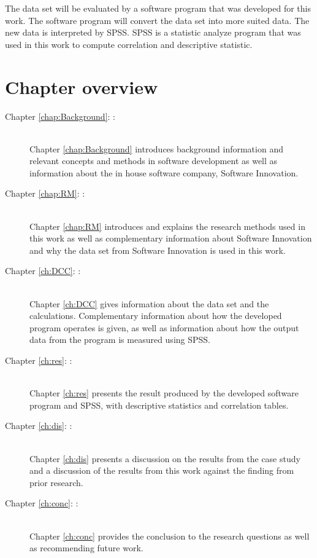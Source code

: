 \documentclass[UKenglish]{ifimaster}  %
\begin{document}
The data set will be evaluated by a software program that was developed for this work. The software program will convert the data set into more suited data. The new data is interpreted by SPSS. SPSS is a statistic analyze program that was used in this work to compute correlation and descriptive statistic. 

\section{Chapter overview}
\begin{description}
\item[Chapter \ref{chap:Background}: :] \hfill \\  
Chapter \ref{chap:Background} introduces background information and relevant concepts and methods in software development as well as information about the in house software company, Software Innovation. 
\item[Chapter \ref{chap:RM}: :] \hfill \\  
Chapter \ref{chap:RM} introduces and explains the research methods used in this work as well as complementary information about Software Innovation and why the data set from Software Innovation is used in this work.  
\item[Chapter \ref{ch:DCC}: :] \hfill \\
Chapter \ref{ch:DCC} gives information about the data set and the calculations. Complementary information about how the developed program operates is given, as well as information about how the output data from the program is measured using SPSS.

\item[Chapter \ref{ch:res}: :] \hfill \\
Chapter \ref{ch:res} presents the result produced by the developed software program and SPSS, with descriptive statistics and correlation tables. 
\item[Chapter \ref{ch:dis}: :] \hfill \\
Chapter \ref{ch:dis} presents a discussion on the results from the case study and a discussion of the results from this work against the finding from prior research. 
\item[Chapter \ref{ch:conc}: :] \hfill \\
Chapter \ref{ch:conc} provides the conclusion to the research questions as well as recommending future work.
\end{description}
\end{document}
